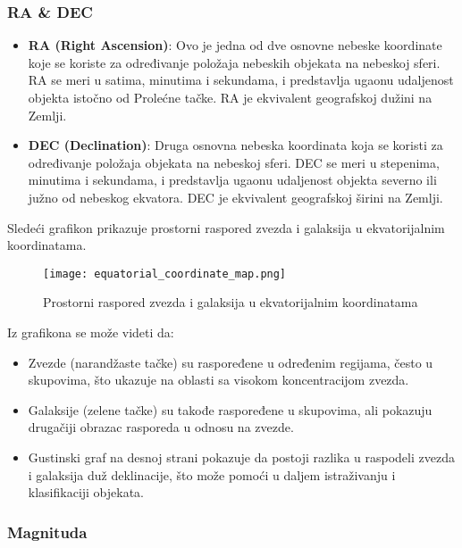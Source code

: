 \documentclass[a4paper,12pt]{article}
\begin{document}
\subsubsection{RA \& DEC}

\begin{itemize}
    \item \textbf{RA (Right Ascension)}: Ovo je jedna od dve osnovne nebeske koordinate koje se koriste za određivanje položaja nebeskih objekata na nebeskoj sferi. RA se meri u satima, minutima i sekundama, i predstavlja ugaonu udaljenost objekta istočno od Prolećne tačke. RA je ekvivalent geografskoj dužini na Zemlji.
    
    \item \textbf{DEC (Declination)}: Druga osnovna nebeska koordinata koja se koristi za određivanje položaja objekata na nebeskoj sferi. DEC se meri u stepenima, minutima i sekundama, i predstavlja ugaonu udaljenost objekta severno ili južno od nebeskog ekvatora. DEC je ekvivalent geografskoj širini na Zemlji.
\end{itemize}

Sledeći grafikon prikazuje prostorni raspored zvezda i galaksija u ekvatorijalnim koordinatama. 

\begin{figure}[H]
\centering
\texttt{[image: equatorial\_coordinate\_map.png]}
\caption{Prostorni raspored zvezda i galaksija u ekvatorijalnim koordinatama}
\label{fig:equatorial_coordinates}
\end{figure}

Iz grafikona se može videti da:

\begin{itemize}
    \item Zvezde (narandžaste tačke) su raspoređene u određenim regijama, često u skupovima, što ukazuje na oblasti sa visokom koncentracijom zvezda.
    \item Galaksije (zelene tačke) su takođe raspoređene u skupovima, ali pokazuju drugačiji obrazac rasporeda u odnosu na zvezde.
    \item Gustinski graf na desnoj strani pokazuje da postoji razlika u raspodeli zvezda i galaksija duž deklinacije, što može pomoći u daljem istraživanju i klasifikaciji objekata.
\end{itemize}

\subsubsection{Magnituda}
\end{document}
